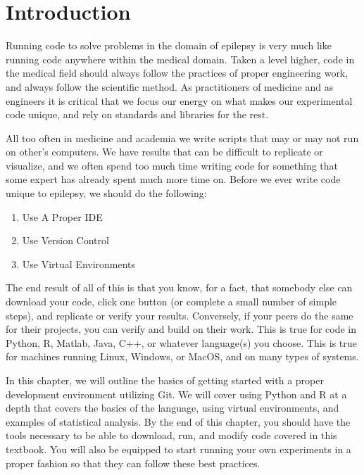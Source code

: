 \section{Introduction}
Running code to solve problems in the domain of epilepsy is very much like running code anywhere within the medical domain.
Taken a level higher, code in the medical field should always follow the practices of proper engineering work, and always follow the scientific method.
As practitioners of medicine and as engineers it is critical that we focus our energy on what makes our experimental code unique, and rely on standards and libraries for the rest.

All too often in medicine and academia we write scripts that may or may not run on other's computers.
We have results that can be difficult to replicate or visualize, and we often spend too much time writing code for something that some expert has already spent much more time on.
Before we ever write code unique to epilepsy, we should do the following:
\begin{enumerate}
    \item Use A Proper IDE
    \item Use Version Control
    \item Use Virtual Environments
\end{enumerate}

The end result of all of this is that you know, for a fact, that somebody else can download your code, click one button (or complete a small number of simple steps), and replicate or verify your results.
Conversely, if your peers do the same for their projects, you can verify and build on their work.
This is true for code in Python, R, Matlab, Java, C++, or whatever language(s) you choose.
This is true for machines running Linux, Windows, or MacOS, and on many types of systems.

In this chapter, we will outline the basics of getting started with a proper development environment utilizing Git.
We will cover using Python and R at a depth that covers the basics of the language, using virtual environments, and examples of statistical analysis.
By the end of this chapter, you should have the tools necessary to be able to download, run, and modify code covered in this textbook.
You will also be equipped to start running your own experiments in a proper fashion so that they can follow these best practices.